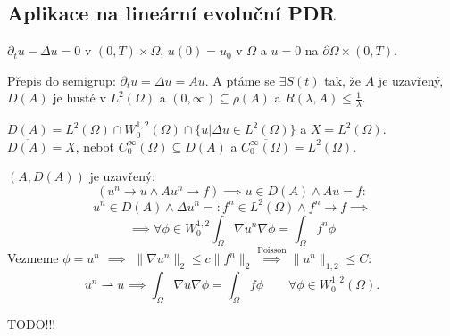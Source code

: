 \documentclass[12pt]{article}					%
\begin{document}
\subsection{Aplikace na lineární evoluční PDR}
\begin{priklad}
	$\partial_t u - \Delta u = 0$ v $(0, T) \times \Omega$, $u(0) = u_0$ v $\Omega$ a $u = 0$ na $\partial \Omega \times (0, T)$.

	Přepis do semigrup: $\partial_t u = \Delta u = A u$. A ptáme se $\exists S(t)$ tak, že $A$ je uzavřený, $D(A)$ je husté v $L^2(\Omega)$ a $(0, ∞) \subseteq \rho(A)$ a $R(\lambda, A) ≤ \frac{1}{\lambda}$.

	$D(A) = L^2(\Omega) \cap W_0^{1, 2}(\Omega) \cap \{u | \Delta u \in L^2(\Omega)\}$ a $X = L^2(\Omega)$. $\overline{D(A)} = X$, neboť $C_0^∞(\Omega) \subseteq D(A)$ a $\overline{C_0^∞(\Omega)} = L^2(\Omega)$.

	$(A, D(A))$ je uzavřený:
	$$ (u^n \rightarrow u \land Au^n \rightarrow f) \implies u \in D(A) \land Au = f: $$
	$$ u^n \in D(A) \land \Delta u^n =: f^n \in L^2(\Omega) \land f^n \rightarrow f \implies $$
	$$ \implies \forall \phi \in W_0^{1, 2} \int_\Omega \nabla u^n \nabla \phi = \int_\Omega f^n \phi $$
	Vezmeme $\phi = u^n$ $\implies$ $\|\nabla u^n\|_2 ≤ c \|f^n\|_2 \overset{\text{Poisson}}\implies \|u^n\|_{1,2} ≤ C$:
	$$ u^n \rightharpoonup u \implies \int_\Omega \nabla u \nabla \phi = \int_\Omega f \phi \qquad \forall \phi \in W_0^{1, 2}(\Omega). $$

	TODO!!!
\end{priklad}
\end{document}
